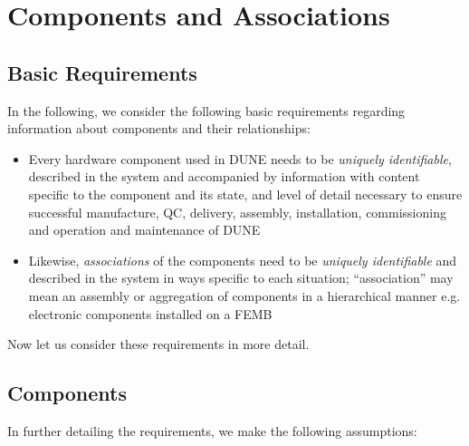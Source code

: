 \documentclass[pdftex,12pt,letter]{article}
\begin{document}
\section{Components and Associations}
\subsection{Basic Requirements}

In the following, we consider the following basic requirements regarding information about components and their relationships:

\begin{itemize}

\item Every hardware component used in DUNE needs to be \textit{uniquely identifiable}, described in the
system and accompanied by information with content specific to the component and its state, and level
of detail necessary to ensure successful manufacture, QC, delivery, assembly, installation, commissioning
and operation and maintenance of DUNE

\item Likewise, \textit{associations} of the components need to be \textit{uniquely identifiable} and described
in the system in ways specific to each situation; ``association'' may mean an assembly or aggregation of
components in a hierarchical manner e.g.\,electronic components installed on a FEMB


\end{itemize}

\noindent Now let us consider these requirements in more detail.

\subsection{Components}
In further detailing the requirements, we make the following assumptions:
\end{document}
